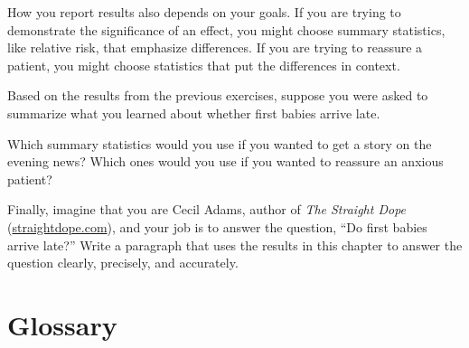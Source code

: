 \documentclass[12pt]{book}
\begin{document}
How you report results also depends on your goals.  If you are
trying to demonstrate the significance of an effect, you might choose
summary statistics, like relative risk, that emphasize differences.
If you are trying to reassure a patient, you might choose statistics
that put the differences in context.

\begin{ex}

Based on the results from the previous exercises, suppose you were
asked to summarize what you learned about whether first
babies arrive late.

Which summary statistics would you use if you wanted to get a story
on the evening news?  Which ones would you use if you wanted to
reassure an anxious patient?

Finally, imagine that you are Cecil Adams, author of {\it The Straight
  Dope} (\url{straightdope.com}), and your job is to answer the
question, ``Do first babies arrive late?''  Write a paragraph that
uses the results in this chapter to answer the question clearly,
precisely, and accurately.

\end{ex}



\section{Glossary}
\end{document}
